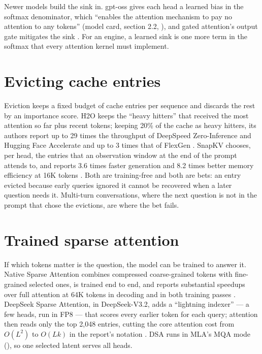 Newer models build the sink in. gpt-oss gives each head a learned bias in the
softmax denominator, which ``enables the attention mechanism to pay no
attention to any tokens'' (model card, section 2.2, \cite{openai2025gptoss}),
and gated attention's output gate mitigates the sink
\cite{qiu2025gatedattention}. For an engine, a learned sink is one more term in
the softmax that every attention kernel must implement.

\section{Evicting cache entries}

Eviction keeps a fixed budget of cache entries per sequence and discards the
rest by an importance score. H2O keeps the ``heavy hitters'' that received the
most attention so far plus recent tokens; keeping 20\% of the cache as heavy
hitters, its authors report up to 29 times the throughput of DeepSpeed
Zero-Inference and Hugging Face Accelerate and up to 3 times that of FlexGen
\cite{zhang2023h2o}. SnapKV chooses, per head, the entries
that an observation window at the end of the prompt attends to, and reports 3.6
times faster generation and 8.2 times better memory efficiency at 16K tokens
\cite{li2024snapkv}. Both are training-free and both are bets: an entry
evicted because early queries ignored it cannot be recovered when a later
question needs it. Multi-turn conversations, where the next question is not in
the prompt that chose the evictions, are where the bet fails.

\section{Trained sparse attention}

If which tokens matter is the question, the model can be trained to answer it.
Native Sparse Attention combines compressed coarse-grained tokens with
fine-grained selected ones, is trained end to end, and reports substantial
speedups over full attention at 64K tokens in decoding and in both training
passes \cite{yuan2025nsa}. DeepSeek Sparse Attention, in DeepSeek-V3.2, adds a
``lightning indexer'' --- a few heads, run in FP8 --- that scores every earlier
token for each query; attention then reads only the top 2,048 entries, cutting
the core attention cost from $O(L^{2})$ to $O(Lk)$ in the report's notation
\cite{deepseek2025v32}. DSA runs in MLA's MQA mode (), so
one selected latent serves all heads.

